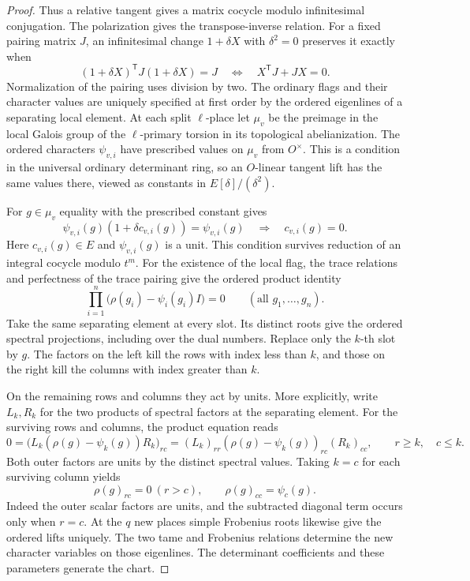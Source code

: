 \begin{proof}
Thus a relative tangent gives a matrix cocycle modulo
infinitesimal conjugation. The polarization gives the transpose-inverse relation. For a fixed pairing matrix \(J\), an infinitesimal change \(1+\delta X\) with \(\delta^2=0\) preserves it exactly when
\[
 (1+\delta X)^{\mathsf T}J(1+\delta X)=J
 \quad\Longleftrightarrow\quad X^{\mathsf T}J+JX=0 .
\]
Normalization of the pairing uses division by two. The ordinary flags and their
character values are uniquely specified at first order
by the ordered eigenlines of a separating local
element. At each split \(\ell\)-place let \(\mu_v\) be the
preimage in the local Galois group of the \(\ell\)-primary
torsion in its topological abelianization. The ordered
characters \(\psi_{v,i}\) have prescribed values on
\(\mu_v\) from \(O^\times\). This is a condition in the
universal ordinary determinant ring, so an \(O\)-linear
tangent lift has the same values there, viewed as constants
in \(E[\delta]/(\delta^2)\).

For \(g\in\mu_v\) equality with the prescribed constant gives
\[
 \psi_{v,i}(g)(1+\delta c_{v,i}(g))=\psi_{v,i}(g)
 \quad\Longrightarrow\quad c_{v,i}(g)=0 .
\]
Here \(c_{v,i}(g)\in E\) and \(\psi_{v,i}(g)\) is a unit.
This condition survives reduction of an integral cocycle
modulo \(t^m\).
For the existence of the local flag, the trace relations and perfectness of the trace pairing give the ordered product identity
\[
 \prod_{i=1}^n\bigl(\rho(g_i)-\psi_i(g_i)I\bigr)=0\qquad(\text{all }g_1,\ldots,g_n).
\]
Take the same separating element at every
slot. Its distinct roots give the ordered spectral
projections, including over the dual numbers.
Replace only the \(k\)-th slot by \(g\). The factors
on the left kill the rows with index less than \(k\),
and those on the right kill the columns with index
greater than \(k\).

On the remaining rows and columns
they act by units. More explicitly, write \(L_k,R_k\) for the two products
of spectral factors at the separating element. For the
surviving rows and columns, the product equation reads
\[
 0=\bigl(L_k(\rho(g)-\psi_k(g))R_k\bigr)_{rc}
       =(L_k)_{rr}(\rho(g)-\psi_k(g))_{rc}(R_k)_{cc},
             \qquad r\ge k,\quad c\le k .
\]
Both outer factors are units by the distinct spectral values.
Taking \(k=c\) for each surviving column yields
\[
 \rho(g)_{rc}=0\ (r>c),\qquad \rho(g)_{cc}=\psi_c(g).
\]
Indeed the outer scalar factors are units, and the subtracted diagonal term occurs only when \(r=c\).
At the \(q\) new places simple Frobenius roots likewise
give the ordered lifts uniquely. The two tame and
Frobenius relations determine the new character
variables on those eigenlines. The determinant
coefficients and these parameters generate the chart.


\end{proof}
